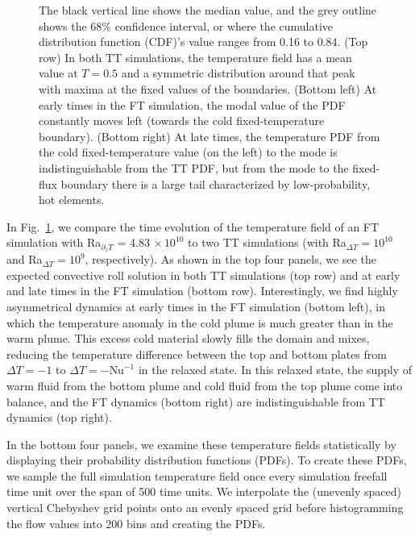 \begin{figure}[p!]
{	The black vertical line shows the median value, and the grey outline shows the 68\% confidence interval, or where the cumulative distribution function (CDF)'s value ranges from 0.16 to 0.84.
	(Top row) In both TT simulations, the temperature field has a mean value at $T = 0.5$ and a symmetric distribution around that peak with maxima at the fixed values of the boundaries. 
	(Bottom left) At early times in the FT simulation, the modal value of the PDF constantly moves left (towards the cold fixed-temperature boundary).
	(Bottom right) At late times, the temperature PDF from the cold fixed-temperature value (on the left) to the mode is indistinguishable from the TT PDF, but from the mode to the fixed-flux boundary there is a large tail characterized by low-probability, hot elements.
	\label{fig:rbc_evolution_dynamics} }
\end{figure}

In Fig.~\ref{fig:rbc_evolution_dynamics}, we compare the time evolution of the temperature field of an FT simulation with Ra$_{\partial_z T}$ = 4.83$\,\times 10^{10}$ to two TT simulations (with Ra$_{\Delta T} = 10^{10}$ and Ra$_{\Delta T} = 10^9$, respectively).
As shown in the top four panels, we see the expected convective roll solution in both TT simulations (top row) and at early and late times in the FT simulation (bottom row).
Interestingly, we find highly asymmetrical dynamics at early times in the FT simulation (bottom left), in which the temperature anomaly in the cold plume is much greater than in the warm plume.
This excess cold material slowly fills the domain and mixes, reducing the temperature difference between the top and bottom plates from $\Delta T = -1$ to $\Delta T = -\text{Nu}^{-1}$ in the relaxed state.
In this relaxed state, the supply of warm fluid from the bottom plume and cold fluid from the top plume come into balance, and the FT dynamics (bottom right) are indistinguishable from TT dynamics (top right).

In the bottom four panels, we examine these temperature fields statistically by displaying their probability distribution functions (PDFs).
To create these PDFs, we sample the full simulation temperature field once every simulation freefall time unit over the span of 500 time units.
We interpolate the (unevenly spaced) vertical Chebyshev grid points onto an evenly spaced grid before histogramming the flow values into 200 bins and creating the PDFs.

